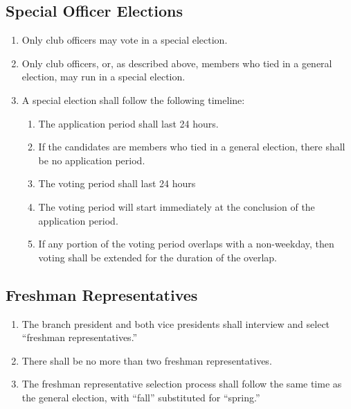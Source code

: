 \documentclass{article}
\begin{document}
\subsection{Special Officer Elections}
\begin{enumerate}
\item Only club officers may vote in a special election.
\item Only club officers, or, as described above, members who tied in a general election, may run in a special election.
\item A special election shall follow the following timeline:
  \begin{enumerate}
  \item The application period shall last 24 hours.
  \item If the candidates are members who tied in a general election, there shall be no application period.
  \item The voting period shall last 24 hours
  \item The voting period will start immediately at the conclusion of the application period.
  \item If any portion of the voting period overlaps with a non-weekday, then voting shall be extended for the duration of the overlap.
  \end{enumerate}
\end{enumerate}

\subsection{Freshman Representatives}
\begin{enumerate}
\item The branch president and both vice presidents shall interview and select ``freshman representatives.''
\item There shall be no more than two freshman representatives.
\item The freshman representative selection process shall follow the same time as the general election, with ``fall'' substituted for ``spring.''
\end{enumerate}
\end{document}
